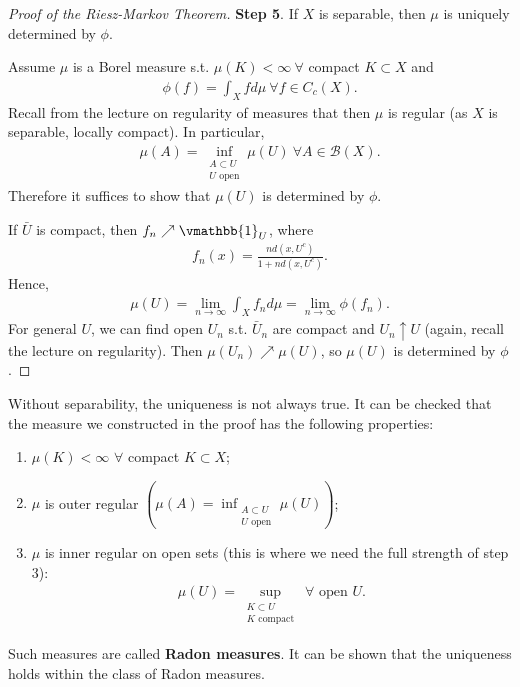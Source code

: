 \begin{proof}[Proof of the Riesz-Markov Theorem]
    \textbf{Step 5}. If \(X\) is separable, then \(\mu\) is uniquely determined by \(\phi\).

    Assume \(\mu\) is a Borel measure s.t. \(\mu(K)<\infty\ \forall\) compact \(K\subset X\) and 
    \begin{align*}
        \phi(f) = \int_X f d\mu \ \forall f\in C_c(X).
    \end{align*}
    Recall from the lecture on regularity of measures that then \(\mu\) is regular (as \(X\) is separable, locally compact). In particular,
    \begin{align*}
        \mu(A) = \inf_{\substack{A\subset U \\ U \text{ open}}} \mu(U) \ \forall A\in \mathscr{B}(X).
    \end{align*}
    Therefore it suffices to show that \(\mu(U)\) is determined by \(\phi\).

    If \(\bar{U}\) is compact, then \(f_n\nearrow \vmathbb{1}_U\), where
    \begin{align*}
        f_n(x) = \frac{n d(x,U^c)}{1 + nd(x,U^c)}.
    \end{align*}
    Hence,
    \begin{align*}
        \mu(U) = \lim\limits_{n\rightarrow\infty}\int_X f_n d\mu = \lim\limits_{n\rightarrow\infty} \phi(f_n).
    \end{align*}
    For general \(U\), we can find open \(U_n\) s.t. \(\bar{U}_n\) are compact and \(U_n\uparrow U\) (again, recall the lecture on regularity). Then \(\mu(U_n)\nearrow\mu(U)\), so \(\mu(U)\) is determined by \(\phi\).
\end{proof}
\fi
\begin{remark}
    Without separability, the uniqueness is not always true. It can be checked that the measure we constructed in the proof has the following properties:
    \begin{enumerate}[label=(\roman*)]
        \item \(\mu(K)<\infty\) \(\forall\) compact \(K\subset X\);
        \item \(\mu\) is outer regular \((\mu(A)=\inf_{\substack{A\subset U\\ U\text{ open}}} \mu(U))\);
        \item \(\mu\) is inner regular on open sets (this is where we need the full strength of step 3):
        \begin{align*}
            \mu(U) = \sup_{\substack{K\subset U \\ K \text{ compact}}} \ \forall \text{ open }U.
        \end{align*}
    \end{enumerate}
    Such measures are called \textbf{Radon measures}. It can be shown that the uniqueness holds within the class of Radon measures.
\end{remark}
